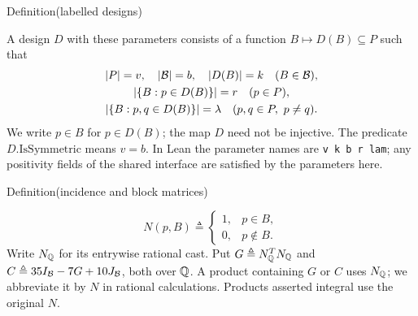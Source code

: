 \begin{mergedproofsection}
\begin{namedresult}{Definition}{(labelled designs)}\label{hc:def:design}
 \uses{}
 \leavevmode\par
 A design $D$ with these parameters consists of a function
 $B\mapsto D(B)\subseteq P$ such that
 \[
 \begin{gathered}
 |P|=v,\quad |{\mathcal B}|=b,\quad |D(B)|=k\quad(B\in{\mathcal B}),\\
 |\{B:p\in D(B)\}|=r\quad(p\in P),\\
 |\{B:p,q\in D(B)\}|=\lambda\quad(p,q\in P,\ p\ne q).
 \end{gathered}
 \]
 We write $p\in B$ for $p\in D(B)$; the map $D$ need not be injective.
 The predicate $D.\mathrm{IsSymmetric}$ means $v=b$.
 In Lean the parameter names are \texttt{v k b r lam}; any positivity
 fields of the shared interface are satisfied by the parameters here.
\end{namedresult}

\begin{namedresult}{Definition}{(incidence and block matrices)}\label{hc:def:matrices}
 \leavevmode\par
 \[
 N(p,B)\triangleq\begin{cases}1,&p\in B,\\0,&p\notin B.\end{cases}
 \]
 Write $N_{{\mathbb Q}}$ for its entrywise rational cast. Put
 $G\triangleq N_{{\mathbb Q}}^TN_{{\mathbb Q}}$ and
 $C\triangleq35I_{{\mathcal B}}-7G+10J_{{\mathcal B}}$, both over ${\mathbb Q}$.
 A product containing $G$ or $C$ uses $N_{{\mathbb Q}}$; we abbreviate it
 by $N$ in rational calculations. Products asserted integral use the
 original $N$.
\end{namedresult}


\end{mergedproofsection}
